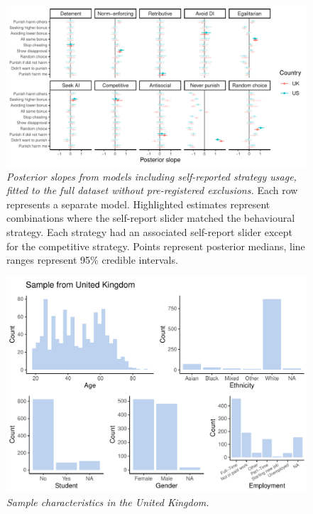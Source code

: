 \documentclass[
  man,floatsintext]{apa6}
\begin{document}
\newpage









\begin{figure}
\centering
\includegraphics{manuscript_files/figure-latex/plotAllSliders1-1.pdf}
\caption{\label{fig:plotAllSliders1}\emph{Posterior slopes from models including
self-reported strategy usage, fitted to the full dataset without pre-registered
exclusions.} Each row represents a separate model. Highlighted estimates
represent combinations where the self-report slider matched the behavioural
strategy. Each strategy had an associated self-report slider except for the
competitive strategy. Points represent posterior medians, line ranges represent
95\% credible intervals.}
\end{figure}

\newpage



\begin{figure}
\centering
\includegraphics{manuscript_files/figure-latex/plotSampleUK-1.pdf}
\caption{\label{fig:plotSampleUK}\emph{Sample characteristics in the United Kingdom.}}
\end{figure}
\end{document}
